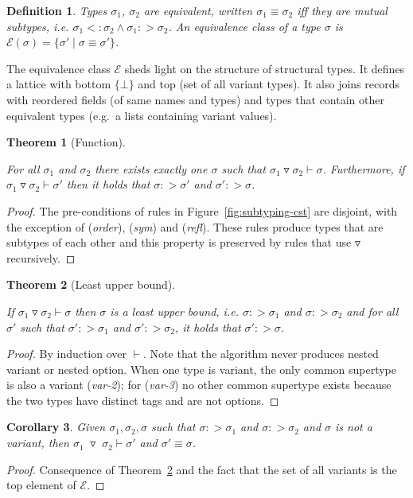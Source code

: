 \documentclass[10pt,preprint,blind,clearpagebib]{sigplanconf}
\newcommand{\tsep}[0]{\; \triangledown \;}
\newtheorem{definition}{Definition}
\newtheorem{theorem}{Theorem}
\newtheorem{corollary}[theorem]{Corollary}
\begin{document}
\begin{definition}
Types $\sigma_1$, $\sigma_2$ are \emph{equivalent}, written $\sigma_1 \equiv \sigma_2$ iff
they are mutual subtypes, i.e. $\sigma_1 <: \sigma_2 \wedge \sigma_1 :> \sigma_2$.
An equivalence class of a type $\sigma$ is $\mathcal{E}(\sigma) = \{ \sigma' \;|\; \sigma\equiv\sigma' \}$.
\end{definition}

\noindent
The equivalence class $\mathcal{E}$ sheds light on the structure of structural types. It defines
a lattice with bottom $\{ \bot \}$ and top (set of all variant types). It also joins records with
reordered fields (of same names and types) and types that contain other equivalent types (e.g.~a
lists containing variant values).

\begin{theorem}[Function]
\label{thm:func}
\raggedright
For all $\sigma_1$ and $\sigma_2$ there exists exactly one $\sigma$ such that 
$\sigma_1 \triangledown \sigma_2 \vdash \sigma$.
Furthermore, if $\sigma_1 \triangledown \sigma_2 \vdash \sigma'$
then it holds that $\sigma :> \sigma'$ and $\sigma' :> \sigma$.
\end{theorem}
\begin{proof}
The pre-conditions of rules in Figure~\ref{fig:subtyping-cst} are disjoint, with the exception 
of (\emph{order}), (\emph{sym}) and (\emph{refl}). These rules produce types that are subtypes
of each other and this property is preserved by rules that use $\triangledown$ recursively.
\end{proof}

\begin{theorem}[Least upper bound]
\label{thm:lub}
\raggedright
If $\sigma_1 \triangledown \sigma_2 \vdash \sigma$ then $\sigma$ is a least upper bound, i.e. 
$\sigma :> \sigma_1$ and $\sigma :> \sigma_2$ and for all $\sigma'$ such that $\sigma' :> \sigma_1$
and $\sigma' :> \sigma_2$, it holds that $\sigma' :> \sigma$.
\end{theorem}
\begin{proof}
By induction over $\vdash$. Note that the algorithm never produces nested variant or nested
option. When one type is variant, the only common supertype is also a variant (\emph{var-2}); 
for (\emph{var-3}) no other common supertype exists because the two types have distinct 
tags and are not options.
\end{proof}

\begin{corollary}
\label{thm:no-unions}
Given $\sigma_1, \sigma_2, \sigma$ such that $\sigma :> \sigma_1$ and $\sigma :> \sigma_2$ and 
$\sigma$ is not a variant, then $\sigma_1 \tsep \sigma_2 \vdash \sigma'$ 
and $\sigma' \equiv \sigma$.
\end{corollary}
\begin{proof}
Consequence of Theorem~\ref{thm:lub} and the fact that the set of all variants is the
top element of $\mathcal{E}$.
\end{proof}
\end{document}
